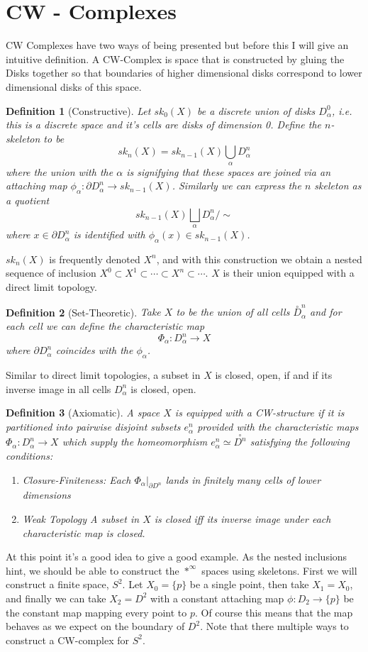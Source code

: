 \documentclass[40pt]{article}
\newtheorem{definition}{Definition}[section]
\begin{document}
	\section{CW - Complexes}
		CW Complexes have two ways of being presented but before this I will give an intuitive definition. A CW-Complex is space that is constructed by gluing the Disks together so that boundaries of higher dimensional disks correspond to lower dimensional disks of this space. 
		\begin{definition}[Constructive]
			Let $sk_0(X)$ be a discrete union of disks $D_\alpha^0$, i.e. this is a discrete space and it's cells are disks of dimension 0. Define the $n$-skeleton to be 
			\[
			sk_n(X) = sk_{n-1}(X)\bigcup_\alpha D_\alpha^n
			\]
			where the union with the $\alpha$ is signifying that these spaces are joined via an attaching map $\phi_\alpha: \partial D_\alpha^n \rightarrow sk_{n-1}(X)$. Similarly we can express the $n$ skeleton as a quotient
			\[
			sk_{n-1}(X)\bigsqcup_\alpha D_\alpha^n/\sim
			\]
			where $x \in \partial D_\alpha^n$ is identified with $\phi_\alpha(x) \in sk_{n-1}(X)$. 
		\end{definition}
		$sk_n(X)$ is frequently denoted $X^n$, and with this construction we obtain a nested sequence of inclusion $X^0 \subset X^1 \subset \cdots \subset X^n \subset \cdots$. $X$ is their union equipped with a direct limit topology.
		\begin{definition}[Set-Theoretic]
			Take $X$ to be the union of all cells $\overset{\circ}{D}_\alpha^n$ and for each cell we can define the characteristic map 
			\[
			\Phi_\alpha : D_\alpha^n \rightarrow X
			\]
			where $\partial D_\alpha^n$ coincides with the $\phi_\alpha$.
		\end{definition}
		Similar to direct limit topologies, a subset in $X$ is closed, open, if and if its inverse image in all cells $D_\alpha^n$ is closed, open. 
		\begin{definition}[Axiomatic]
			A space $X$ is equipped with a CW-structure if it is partitioned into pairwise disjoint subsets $e_\alpha^n$ provided with the characteristic maps $\Phi_\alpha : D_\alpha^n \rightarrow X$ which supply the homeomorphism $e_\alpha^n \simeq \overset{\circ}{D^n}$ satisfying the following conditions:
			\begin{enumerate}
				\item Closure-Finiteness:  Each $\Phi_\alpha|_{\partial D^n}$ lands in finitely many cells of lower dimensions
				\item Weak Topology A subset in $X$ is closed iff its inverse image under each characteristic map is closed. 
			\end{enumerate}
		\end{definition}
		At this point it's a good idea to give a good example. As the nested inclusions hint, we should be able to construct the $*^\infty$ spaces using skeletons. First we will construct a finite space, $S^2$. Let $X_0 = \{p\}$ be a single point, then take $X_1 = X_0$, and finally we can take $X_2 = D^2$ with a constant attaching map $\phi: D_2 \rightarrow \{p\}$ be the constant map mapping every point to $p$. Of course this means that the map behaves as we expect on the boundary of $D^2$. Note that there multiple ways to construct a CW-complex for $S^2$. 
\end{document}
